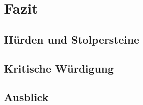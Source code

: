 \section{Fazit} \thispagestyle{nomarkstyle}
\subsection{Hürden und Stolpersteine}
\subsection{Kritische Würdigung}
\subsection{Ausblick}
